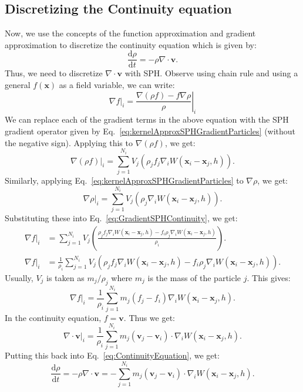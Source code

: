 \documentclass{article}
\newcommand{\vx}{\mathbf{x}}
\newcommand{\dd}{\mathrm{d}}
\newcommand{\vv}{\mathbf{v}}
\begin{document}
\subsection*{Discretizing the Continuity equation}
Now, we use the concepts of the function approximation and gradient approximation to discretize the continuity equation which is given by:
\begin{equation}
  \label{eq:ContinuityEquation}
    \frac{\dd \rho}{\dd t} = - \rho \nabla \cdot \mathbf{v}.
\end{equation}
Thus, we need to discretize $\nabla \cdot \mathbf{v}$ with SPH. Observe using chain rule and using a general $f(\vx)$ as a field variable, we can write:
\begin{equation}
  \label{eq:GradientSPHContinuity}
  \nabla f|_i = \left. \frac{\nabla(\rho f) - f\nabla \rho}{\rho}\right|_i
\end{equation}
We can replace each of the gradient terms in the above equation with the SPH gradient operator given by Eq.~\ref{eq:kernelApproxSPHGradientParticles} (without the negative sign). Applying this to $\nabla(\rho f)$, we get:
\begin{equation}
  \label{eq:continuityTerm1}
  \nabla(\rho f)|_i = \sum_{j=1}^{N_i} V_j \left( \rho_j f_j \nabla_i W(\vx_i - \vx_j, h) \right).
\end{equation}
Similarly, applying Eq.~\ref{eq:kernelApproxSPHGradientParticles} to $\nabla \rho$, we get:
\begin{equation}
  \label{eq:continuityTerm2}
  \nabla \rho|_i = \sum_{j=1}^{N_i} V_j \left( \rho_j \nabla_i W(\vx_i - \vx_j, h) \right).
\end{equation}
Substituting these into Eq.~\ref{eq:GradientSPHContinuity}, we get:
\begin{align}
  \nabla f|_i &= \sum_{j=1}^{N_i} V_j \left( \frac{\rho_j f_j \nabla_i W(\vx_i - \vx_j, h) - f_i \rho_j \nabla_i W(\vx_i - \vx_j, h)}{\rho_i} \right). \\
  \nabla f|_i &= \frac{1}{\rho_i} \sum_{j=1}^{N_i} V_j \left( \rho_j f_j \nabla_i W(\vx_i - \vx_j, h) - f_i \rho_j \nabla_i W(\vx_i - \vx_j, h) \right).
\end{align}
Usually, $V_j$ is taken as $m_j / \rho_j$ where $m_j$ is the mass of the particle $j$. This gives:
\begin{equation}
  \label{eq:contGradientOp}
  \nabla f|_i = \frac{1}{\rho_i} \sum_{j=1}^{N_i}  m_j \left( f_j - f_i \right) \nabla_i W(\vx_i - \vx_j, h).
\end{equation}
In the continuity equation, $f = \vv$. Thus we get:
\begin{equation}
  \nabla \cdot \vv|_i = \frac{1}{\rho_i} \sum_{j=1}^{N_i}  m_j \left( \vv_j - \vv_i \right) \cdot \nabla_i W(\vx_i - \vx_j, h).
\end{equation}
Putting this back into Eq.~\ref{eq:ContinuityEquation}, we get:
\begin{equation}
  \frac{\dd \rho}{\dd t} = - \rho \nabla \cdot \vv = - \sum_{j=1}^{N_i}  m_j \left( \vv_j - \vv_i \right) \cdot \nabla_i W(\vx_i - \vx_j, h).
\end{equation}
\end{document}
